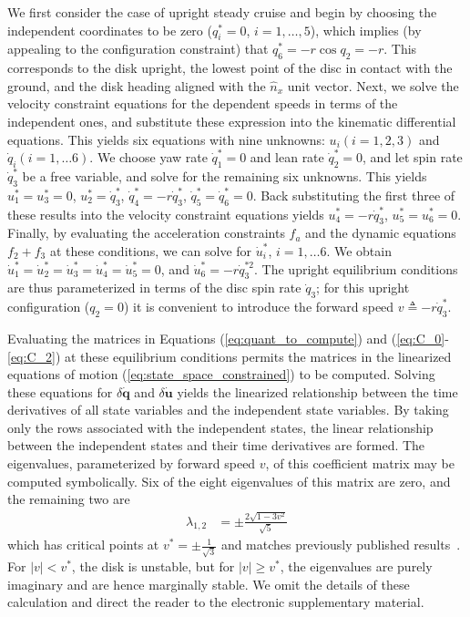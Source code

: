 \documentclass[smallcondensed,final]{svjour3}                     %
\begin{document}
We first consider the case of upright steady cruise and begin by choosing the
independent coordinates to be zero ($q_i^* = 0$, $i = 1,\dots,5$), which
implies (by appealing to the configuration constraint) that $q_6^* = -r
\cos{q_2} = -r$.  This corresponds to the disk upright, the lowest point of the
disc in contact with the ground, and the disk heading aligned with the
$\hat{n}_x$ unit vector.  Next, we solve the velocity constraint equations for
the dependent speeds in terms of the independent ones, and substitute these
expression into the kinematic differential equations. This yields six equations
with nine unknowns: $u_i (i=1,2,3)$ and $\dot{q}_i (i=1,\dots6)$. We choose yaw
rate $\dot{q}_1^* = 0$ and lean rate $\dot{q}_2^* = 0$, and let spin rate
$\dot{q}_3^*$ be a free variable, and solve for the remaining six unknowns.
This yields $u_1^* = u_3^* = 0$, $u_2^* = \dot{q}_3^*$, $\dot{q}_4^* =
-r\dot{q}_3^*$, $\dot{q}_5^* = \dot{q}_6^* = 0$. Back substituting the first
three of these results into the velocity constraint equations yields $u_4^* =
-r\dot{q}_3^*$, $u_5^* = u_6^* = 0$. Finally, by evaluating the acceleration
constraints $f_a$ and the dynamic equations $f_2 + f_3$ at these conditions, we
can solve for $\dot{u}_i^*$, $i = 1,\dots6$. We obtain $\dot{u}_1^* =
\dot{u}_2^* = \dot{u}_3^* = \dot{u}_4^* = \dot{u}_5^* = 0$, and $\dot{u}_6^* =
-r \dot{q}_3^{*2}$. The upright equilibrium conditions are thus parameterized
in terms of the disc spin rate $\dot{q}_3$; for this upright configuration
($q_2 = 0$) it is convenient to introduce the forward speed $v \triangleq
-r\dot{q}_3^*$.

Evaluating the matrices in Equations (\ref{eq:quant_to_compute}) and
(\ref{eq:C_0}-\ref{eq:C_2}) at these equilibrium conditions permits the
matrices in the linearized equations of motion
(\ref{eq:state_space_constrained}) to be computed. Solving these equations for
$\delta\dot{\mathbf{q}}$ and $\delta\dot{\mathbf{u}}$ yields the linearized
relationship between the time derivatives of all state variables and the
independent state variables. By taking only the rows associated with the
independent states, the linear relationship between the independent states and
their time derivatives are formed. The eigenvalues, parameterized by forward
speed $v$, of this coefficient matrix may be computed symbolically. Six of the
eight eigenvalues of this matrix are zero, and the remaining two are
\begin{align}
\label{eq:upright_evals}
  \lambda_{1,2} &= \pm \frac{2\sqrt{1 - 3v^2}}{\sqrt{5}}
\end{align}
which has critical points at $v^*=\pm\frac{1}{\sqrt{3}}$ and matches previously
published results~\cite{Schwab2003,Kane1985,Neimark1972}. For $|v| < v^*$,
the disk is unstable, but for $|v| \geq v^*$, the eigenvalues are purely
imaginary and are hence marginally stable. We omit the details of these
calculation and direct the reader to the electronic supplementary material.
\end{document}
